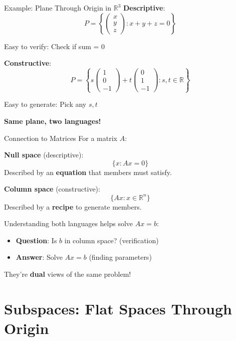 \documentclass[10pt]{beamer}
\theoremstyle{definition}
\newcommand{\x}[1]{\alert{\textbf{#1}}}
\begin{document}
\begin{frame}{Example: Plane Through Origin in $\mathbb{R}^3$}
\textbf{Descriptive}:
$$P = \left\{ \begin{pmatrix} x \\ y \\ z \end{pmatrix} : x + y + z = 0 \right\}$$

Easy to verify: Check if sum = 0

\vfill
\textbf{Constructive}:
$$P = \left\{ s \begin{pmatrix} 1 \\ 0 \\ -1 \end{pmatrix} + t \begin{pmatrix} 0 \\ 1 \\ -1 \end{pmatrix} : s,t \in \mathbb{R} \right\}$$

Easy to generate: Pick any $s, t$

\vfill
\x{Same plane, two languages!}
\end{frame}

\begin{frame}{Connection to Matrices}
For a matrix $A$:

\vfill
\textbf{Null space} (descriptive):
$$\{ x : Ax = 0 \}$$
Described by an \x{equation} that members must satisfy.

\vfill
\textbf{Column space} (constructive):
$$\{ Ax : x \in \mathbb{R}^n \}$$
Described by a \x{recipe} to generate members.

\vfill
Understanding both languages helps solve $Ax = b$:
\begin{itemize}
\item \x{Question}: Is $b$ in column space? (verification)
\item \x{Answer}: Solve $Ax = b$ (finding parameters)
\end{itemize}

They're \x{dual} views of the same problem!
\end{frame}

\section{Subspaces: Flat Spaces Through Origin}
\end{document}
